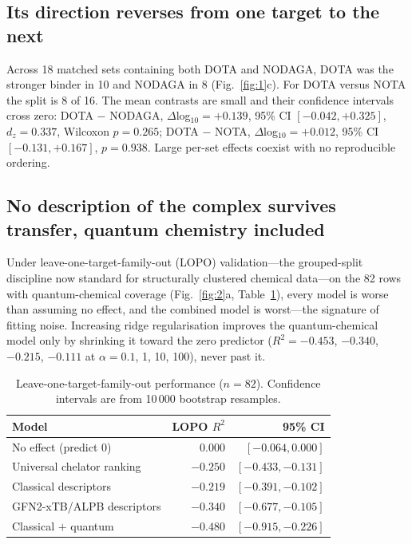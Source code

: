 \subsection{Its direction reverses from one target to the next}

Across 18 matched sets containing both DOTA and NODAGA, DOTA was the stronger binder in 10 and NODAGA in 8 (Fig.~\ref{fig:1}c). For DOTA versus NOTA the split is 8 of 16. The mean contrasts are small and their confidence intervals cross zero: DOTA $-$ NODAGA, $\Delta$log$_{10} = +0.139$, 95\% CI $[-0.042, +0.325]$, $d_z = 0.337$, Wilcoxon $p = 0.265$; DOTA $-$ NOTA, $\Delta$log$_{10} = +0.012$, 95\% CI $[-0.131, +0.167]$, $p = 0.938$. Large per-set effects coexist with no reproducible ordering.

\subsection{No description of the complex survives transfer, quantum chemistry included}

Under leave-one-target-family-out (LOPO) validation---the grouped-split discipline now standard for structurally clustered chemical data\cite{Boldini2025UMAP,Tropsha2025Eval}---on the 82 rows with quantum-chemical coverage (Fig.~\ref{fig:2}a, Table~\ref{tab:lopo}), every model is worse than assuming no effect, and the combined model is worst---the signature of fitting noise. Increasing ridge regularisation improves the quantum-chemical model only by shrinking it toward the zero predictor ($R^2 = -0.453$, $-0.340$, $-0.215$, $-0.111$ at $\alpha = 0.1$, 1, 10, 100), never past it.

\begin{table}[h]
\small
\caption{Leave-one-target-family-out performance ($n = 82$). Confidence intervals are from 10\,000 bootstrap resamples.}
\label{tab:lopo}
\begin{tabular*}{\columnwidth}{@{\extracolsep{\fill}}lrr}
\toprule
Model & LOPO $R^2$ & 95\% CI \\
\midrule
No effect (predict 0)      & $0.000$  & $[-0.064, 0.000]$ \\
Universal chelator ranking & $-0.250$ & $[-0.433, -0.131]$ \\
Classical descriptors      & $-0.219$ & $[-0.391, -0.102]$ \\
GFN2-xTB/ALPB descriptors  & $-0.340$ & $[-0.677, -0.105]$ \\
Classical $+$ quantum      & $-0.480$ & $[-0.915, -0.226]$ \\
\bottomrule
\end{tabular*}
\end{table}

